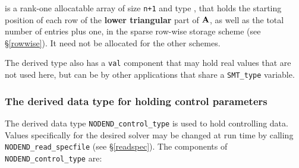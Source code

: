 \documentclass{galahad}
\newcommand{\packagename}{NODEND}
\begin{document}
\begin{description}
 is a rank-one allocatable array of size {\tt n+1} and type
\integer, that holds the starting position of
each row of the {\bf lower triangular} part of ${\mathbf{A}}$, as well
as the total number of entries plus one, in the sparse row-wise storage
scheme (see \S\ref{rowwise}). It need not be allocated for the
other schemes.

\end{description}
The derived type also has a {\tt val} component that may hold real values
that are not used here, but can be by other applications that share
a {\tt SMT\_type} variable.


\subsubsection{The derived data type for holding control
 parameters}\label{typecontrol}
The derived data type
{\tt \packagename\_control\_type}
is used to hold controlling data. Values specifically for the desired solver
may be changed at run time by calling
{\tt \packagename\_read\-\_specfile}
(see \S\ref{readspec}).
The components of
{\tt \packagename\_control\_type}
are:
\end{document}
